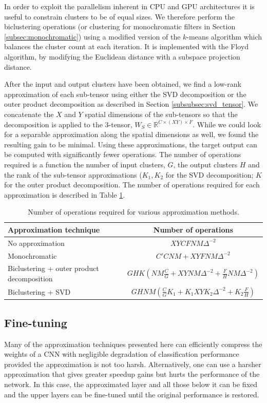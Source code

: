 In order to exploit the parallelism inherent in CPU and GPU
architectures it is useful to constrain clusters to be of equal sizes.
We therefore perform the biclustering operations (or clustering 
for monochromatic filters in Section \ref{subsec:monochromatic}) using a modified
version of the $k$-means algorithm which balances the cluster count at
each iteration. 
It is implemented with the Floyd algorithm, by modifying the Euclidean distance
with a subspace projection distance.

After the input and output clusters have been obtained, we find a low-rank approximation of each 
sub-tensor using either the SVD decomposition or the outer product decomposition as described in Section \ref{subsubsec:svd_tensor}.
We concatenate the $X$ and $Y$ spatial dimensions of the sub-tensors so that the decomposition is applied to the 3-tensor, $W_S \in \mathbb{R}^{C \times (XY) \times F}$.
While we could look for a separable approximation along the spatial dimensions as well, we found the resulting gain to be minimal.    
Using these approximations, the target
output can be computed with significantly fewer operations. The number
of operations required is a function the number
of input clusters, $G$, the output clusters $H$ and the rank of the sub-tensor 
approximations ($K_1, K_2$ for the SVD decomposition; $K$ for the outer product decomposition.  
The number of operations required for each approximation is described in Table \ref{table:ops}.

\begin{table}[t]
\centering
\begin{tabular}{|lc|}
\hline
{\bf Approximation technique} & {\bf Number of operations} \\
\hline
\hline
No approximation & $X Y C F N M \Delta^{-2}$\\
Monochromatic & $C' C N M + X Y F N M \Delta^{-2}$\\
Biclustering + outer product decomposition & $G H K (N M \frac{C}{G} + X Y N M \Delta^{-2} + \frac{F}{H} N M \Delta^{-2})$ \\  
Biclustering + SVD & $G H N M (\frac{C}{G}K_1 + K_1 X Y K_2 \Delta^{-2} + K_2\frac{F}{H})$\\
\hline
\end{tabular}
\caption{Number of operations required for various approximation methods.} 
\label{table:ops}
\vspace{-3mm}
\end{table}

\subsection{Fine-tuning}
Many of the approximation techniques presented here can efficiently compress the weights of a CNN with negligible degradation of classification performance provided the approximation is not too harsh.
Alternatively, one can use a harsher approximation that gives greater speedup gains but hurts the performance of the network. In this case, the approximated layer and all those below it can be fixed and the upper layers can be fine-tuned until the original performance is restored.  
